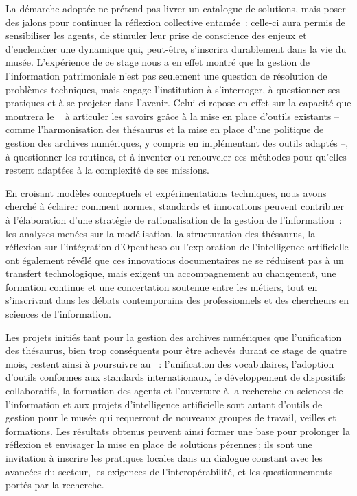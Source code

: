 \medskip



La démarche adoptée ne prétend pas livrer un catalogue de solutions, mais poser des jalons pour continuer la réflexion collective entamée~: celle-ci aura permis de sensibiliser les agents, de stimuler leur prise de conscience des enjeux et d’enclencher une dynamique qui, peut-être, s’inscrira durablement dans la vie du musée. L'expérience de ce stage nous a en effet montré que la gestion de l’information patrimoniale n'est pas seulement une question de résolution de problèmes techniques, mais engage l’institution à s’interroger, à questionner ses pratiques et à se projeter dans l’avenir. Celui-ci repose en effet sur la capacité que montrera le \mae~ à articuler les savoirs grâce à la mise en place d'outils existants -- comme l'harmonisation des thésaurus et la mise en place d'une politique de gestion des archives numériques, y compris en implémentant des outils adaptés --, à questionner les routines, et à inventer ou renouveler ces méthodes pour qu'elles restent adaptées à la complexité de ses missions. 



En croisant modèles conceptuels et expérimentations techniques, nous avons cherché à éclairer comment normes, standards et innovations peuvent contribuer à l’élaboration d’une stratégie de rationalisation de la gestion de l'information~: les analyses menées sur la modélisation, la structuration des thésaurus, la réflexion sur l'intégration d’Opentheso ou l’exploration de l’intelligence artificielle ont également révélé que ces innovations documentaires ne se réduisent pas à un transfert technologique, mais exigent un accompagnement au changement, une formation continue et une concertation soutenue entre les métiers, tout en s’inscrivant dans les débats contemporains des professionnels et des chercheurs en sciences de l’information.

\medskip

Les projets initiés tant pour la gestion des archives numériques que l'unification des thésaurus, bien trop conséquents pour être achevés durant ce stage de quatre mois, restent ainsi à poursuivre au \mae~: l’unification des vocabulaires, l’adoption d’outils conformes aux standards internationaux, le développement de dispositifs collaboratifs, la formation des agents et l’ouverture à la recherche en sciences de l’information et aux projets d’intelligence artificielle sont autant d'outils de gestion pour le musée qui requerront de nouveaux groupes de travail, veilles et formations. Les résultats obtenus peuvent ainsi former une base pour prolonger la réflexion et envisager la mise en place de solutions pérennes ; ils sont une invitation à inscrire les pratiques locales dans un dialogue constant avec les avancées du secteur, les exigences de l’interopérabilité, et les questionnements portés par la recherche.



